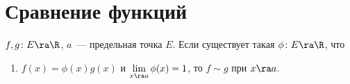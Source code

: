 \section{Сравнение функций}

\begin{Def}
$f,g\colon E \ra \R$, $a$~--- предельная точка $E$. Если существует такая $\phi\colon E \ra \R$, что
\begin{enumerate}
\item $f(x) = \phi(x) g(x)$ и $\lim\limits_{x\ra a} \phi(x) = 1$, то $f \sim g$ при $x \ra a$.
\end{enumerate}
\end{Def}